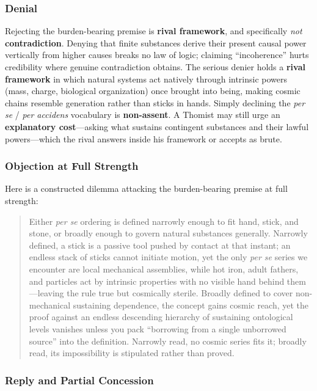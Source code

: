 \subsubsection*{Denial}

Rejecting the burden-bearing premise is \textbf{rival framework}, and specifically \emph{not} \textbf{contradiction}. Denying that finite substances derive their present causal power vertically from higher causes breaks no law of logic; claiming ``incoherence'' hurts credibility where genuine contradiction obtains. The serious denier holds a \textbf{rival framework} in which natural systems act natively through intrinsic powers (mass, charge, biological organization) once brought into being, making cosmic chains resemble generation rather than sticks in hands. Simply declining the \emph{per se} / \emph{per accidens} vocabulary is \textbf{non-assent}. A Thomist may still urge an \textbf{explanatory cost}---asking what sustains contingent substances and their lawful powers---which the rival answers inside his framework or accepts as brute.

\subsubsection*{Objection at Full Strength}

Here is a constructed dilemma attacking the burden-bearing premise at full strength:

\begin{quote}
Either \emph{per se} ordering is defined narrowly enough to fit hand, stick, and stone, or broadly enough to govern natural substances generally. Narrowly defined, a stick is a passive tool pushed by contact at that instant; an endless stack of sticks cannot initiate motion, yet the only \emph{per se} series we encounter are local mechanical assemblies, while hot iron, adult fathers, and particles act by intrinsic properties with no visible hand behind them---leaving the rule true but cosmically sterile. Broadly defined to cover non-mechanical sustaining dependence, the concept gains cosmic reach, yet the proof against an endless descending hierarchy of sustaining ontological levels vanishes unless you pack ``borrowing from a single unborrowed source'' into the definition. Narrowly read, no cosmic series fits it; broadly read, its impossibility is stipulated rather than proved.
\end{quote}

\subsubsection*{Reply and Partial Concession}

